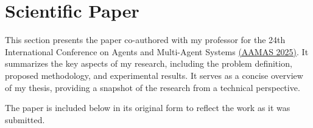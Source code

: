 \section{Scientific Paper}


This section presents the paper co-authored with my professor for the 24th International Conference on Agents and Multi-Agent Systems \href{https://aamas2025.org/}{(AAMAS 2025)}. It summarizes the key aspects of my research, including the problem definition, proposed methodology, and experimental results. It serves as a concise overview of my thesis, providing a snapshot of the research from a technical perspective.\tinydouble

\noindent
The paper is included below in its original form to reflect the work as it was submitted.


\newpage

{}


{}

{}

{}



{}



{}

{}



{}

{}

